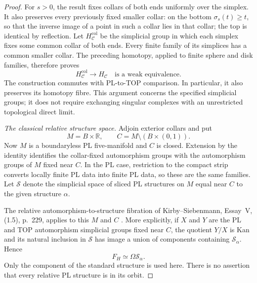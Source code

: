 \begin{proof}
For $s>0$, the result fixes collars of both ends uniformly over the
simplex.  It also preserves every previously fixed smaller collar:
on the bottom $\sigma_s(t)\geq t$, so that the inverse image of a
point in such a collar lies in that collar; the top is identical by
reflection.  Let $H_{\mathcal C}^{\mathrm{col}}$ be the simplicial
group in which each simplex fixes some common collar of both ends.
Every finite family of its simplices has a common smaller collar.
The preceding homotopy, applied to finite sphere and disk families,
therefore proves
\[
 H_{\mathcal C}^{\mathrm{col}}\longrightarrow H_{\mathcal C}
 \quad\text{is a weak equivalence}.
\]
The construction commutes with PL-to-TOP comparison.  In particular,
it also preserves its homotopy fibre.  This argument concerns the
specified simplicial groups; it does not require exchanging singular
complexes with an unrestricted topological direct limit.

\emph{The classical relative structure space.}
Adjoin exterior collars and put
\[
 M=B\times\mathbb R,\qquad C=M\setminus(B\times(0,1)).
\]
Now $M$ is a boundaryless PL five-manifold and $C$ is closed.
Extension by the identity identifies the collar-fixed automorphism
groups with the automorphism groups of $M$ fixed near $C$.
In the PL case, restriction to the compact strip converts locally
finite PL data into finite PL data, so these are the same families.
Let $\mathcal S$ denote the simplicial space of sliced PL structures
on $M$ equal near $C$ to the given structure $\alpha$.

The relative automorphism-to-structure fibration of
Kirby--Siebenmann, Essay~V, (1.5), p.~229, applies to this $M$ and $C$
\cite{KirbySiebenmann1977}.  More explicitly, if $X$ and $Y$ are the
PL and TOP automorphism simplicial groups fixed near $C$, the quotient
$Y/X$ is Kan and its natural inclusion in $\mathcal S$ has image a
union of components containing $\mathcal S_\alpha$.  Hence
\begin{equation}\label{eq:both-ends-fibre-structures}
 F_H\simeq\Omega\mathcal S_\alpha.
\end{equation}
Only the component of the standard structure is used here.  There
is no assertion that every relative PL structure is in its orbit.


\end{proof}
